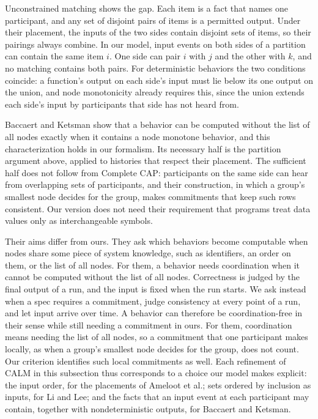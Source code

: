\documentclass[sigconf]{cidr-2027}
\theoremstyle{remark}
\newcommand{\commitment}{commitment\xspace}
\newcommand{\commitments}{commitments\xspace}
\begin{document}
Unconstrained matching shows the gap. Each item is a fact that names one
participant, and any set of disjoint pairs of items is a permitted output. Under their placement, the inputs of the two sides contain disjoint sets of
items, so their pairings always combine. In our model, input events on both
sides of a partition can contain the same item $i$. One side can pair $i$ with
$j$ and the other with $k$, and no matching contains both pairs. For
deterministic behaviors the two conditions coincide: a function's output on
each side's input must lie below its one output on the union, and node
monotonicity already requires this, since the union extends each side's input
by participants that side has not heard from.

Baccaert and Ketsman show that a behavior can be computed without the list of
all nodes exactly when it contains a node monotone behavior, and this
characterization holds in our formalism. Its necessary half is the partition
argument above, applied to histories that respect their placement. The
sufficient half does not follow from Complete CAP: participants on the same
side can hear from overlapping sets of participants, and their construction,
in which a group's smallest node decides for the group, makes \commitments that keep such rows consistent. Our version does not need their requirement that
programs treat data values only as interchangeable symbols.

Their aims differ from ours. They ask which behaviors become computable when
nodes share some piece of system knowledge, such as identifiers, an order on
them, or the list of all nodes. For them, a behavior needs coordination when
it cannot be computed without the list of all nodes. Correctness is judged by
the final output of a run, and the input is fixed when the run starts. We ask
instead when a spec requires a \commitment, judge consistency at every point of
a run, and let input arrive over time. A behavior can therefore be
coordination-free in their sense while still needing a \commitment in ours. For them, coordination means needing the list of all nodes, so a \commitment
that one participant makes locally, as when a group's smallest node decides
for the group, does not count. Our criterion identifies such local
\commitments as well. Each refinement of CALM in this subsection
thus corresponds to a choice our model makes explicit: the input order, for the
placements of Ameloot et al.; sets ordered by inclusion as inputs, for Li and
Lee; and the facts that an input event at each participant may contain,
together with nondeterministic outputs, for Baccaert and Ketsman.
\end{document}

